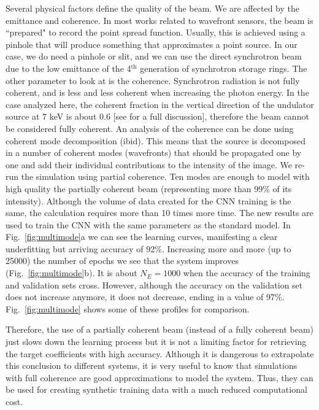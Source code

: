 \documentclass[preprint]{iucr}
\begin{document}
Several physical factors define the quality of the beam. We are affected by the emittance and coherence. In most works related to wavefront sensors, the beam is ``prepared" to record the point spread function. Usually, this is achieved using a pinhole that will produce something that approximates a point source. In our case, we do need a pinhole or slit, and we can use the direct synchrotron beam due to the low emittance of the 4$^\text{th}$ generation of synchrotron storage rings. The other parameter to look at is the coherence. Synchrotron radiation is not fully coherent, and is less and less coherent when increasing the photon energy. In the case analyzed here, the coherent fraction in the vertical direction of the undulator source at 7 keV is about 0.6 [see \cite{multioptics} for a full discussion], therefore the beam cannot be considered fully coherent. An analysis of the coherence can be done using coherent mode decomposition (ibid). This means that the source is decomposed in a number of coherent modes (wavefronts) that should be propagated one by one and add their individual contributions to the intensity of the image. We re-run the simulation using partial coherence. Ten modes are enough to model with high quality the partially coherent beam (representing more than 99\% of its intensity). Although the volume of data created for the CNN training is the same, the calculation requires more than 10 times more time. The new results are used to train the CNN with the same parameters as the standard model. In Fig.~\ref{fig:multimode}a we can see the learning curves, manifesting a clear underfitting but arriving accuracy of 92\%. Increasing more and more (up to 25000) the number of epochs we see that the system improves (Fig.~\ref{fig:multimode}b). It is about $N_E=1000$ when the accuracy of the training and validation sets cross. However, although the accuracy on the validation set does not increase anymore, it does not decrease, ending in a value of 97\%. Fig.~\ref{fig:multimode} shows some of these profiles for comparison.

Therefore, the use of a partially coherent beam (instead of a fully coherent beam) just slows down the learning process but it is not a limiting factor for retrieving the target coefficients with high accuracy. Although it is dangerous to extrapolate this conclusion to different systems, it is very useful to know that simulations with full coherence are good approximations to model the system. Thus, they can be used for creating synthetic training data with a much reduced computational cost. 
\end{document}
